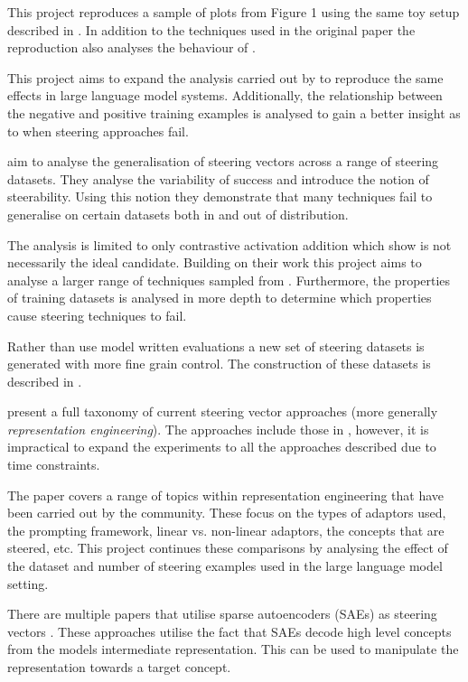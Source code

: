 This project reproduces a sample of plots from Figure 1 using the same toy setup described in .
In addition to the techniques used in the original paper the reproduction also analyses the behaviour of \citet{ace}.

This project aims to expand the analysis carried out by \citet{steering-clear} to reproduce the same effects in large language model systems.
Additionally, the relationship between the negative and positive training examples is analysed to gain a better insight as to when steering approaches fail.

aim to analyse the generalisation of steering vectors across a range of steering datasets.
They analyse the variability of success and introduce the notion of steerability.
Using this notion they demonstrate that many techniques fail to generalise on certain datasets both in and out of distribution.

The analysis is limited to only contrastive activation addition \citep{caa} which \citet{steering-clear} show is not necessarily the ideal candidate.
Building on their work this project aims to analyse a larger range of techniques sampled from \citet{steering-clear}.
Furthermore, the properties of training datasets is analysed in more depth to determine which properties cause steering techniques to fail.

Rather than use model written evaluations \citep{mwe} a new set of steering datasets is generated with more fine grain control.
The construction of these datasets is described in .

present a full taxonomy of current steering vector approaches (more generally \emph{representation engineering}).
The approaches include those in \citet{steering-clear}, however, it is impractical to expand the experiments to all the approaches described due to time constraints.

The paper covers a range of topics within representation engineering that have been carried out by the community.
These focus on the types of adaptors used, the prompting framework, linear vs. non-linear adaptors, the concepts that are steered, etc.
This project continues these comparisons by analysing the effect of the dataset and number of steering examples used in the large language model setting.

There are multiple papers that utilise sparse autoencoders (SAEs) as steering vectors \citep{sae-improved, sae-steering, icl-sae}.
These approaches utilise the fact that SAEs decode high level concepts from the models intermediate representation.
This can be used to manipulate the representation towards a target concept.


